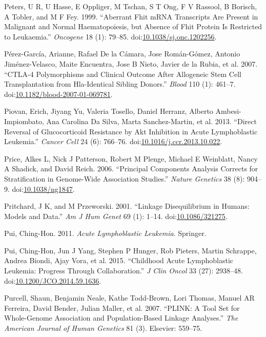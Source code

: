 \documentclass[]{DissertateOSU}
\begin{document}
\hypertarget{ref-peters_1999}{}
Peters, U R, U Hasse, E Oppliger, M Tschan, S T Ong, F V Rassool, B
Borisch, A Tobler, and M F Fey. 1999. ``Aberrant Fhit mRNA Transcripts
Are Present in Malignant and Normal Haematopoiesis, but Absence of Fhit
Protein Is Restricted to Leukaemia.'' \emph{Oncogene} 18 (1): 79--85.
doi:\href{https://doi.org/10.1038/sj.onc.1202256}{10.1038/sj.onc.1202256}.

\hypertarget{ref-perez_garcia_2007}{}
Pérez-García, Arianne, Rafael De la Cámara, Jose Román-Gómez, Antonio
Jiménez-Velasco, Maite Encuentra, Jose B Nieto, Javier de la Rubia, et
al. 2007. ``CTLA-4 Polymorphisms and Clinical Outcome After Allogeneic
Stem Cell Transplantation from Hla-Identical Sibling Donors.''
\emph{Blood} 110 (1): 461--7.
doi:\href{https://doi.org/10.1182/blood-2007-01-069781}{10.1182/blood-2007-01-069781}.

\hypertarget{ref-Piovan_2013}{}
Piovan, Erich, Jiyang Yu, Valeria Tosello, Daniel Herranz, Alberto
Ambesi-Impiombato, Ana Carolina Da Silva, Marta Sanchez-Martin, et al.
2013. ``Direct Reversal of Glucocorticoid Resistance by Akt Inhibition
in Acute Lymphoblastic Leukemia.'' \emph{Cancer Cell} 24 (6): 766--76.
doi:\href{https://doi.org/10.1016/j.ccr.2013.10.022}{10.1016/j.ccr.2013.10.022}.

\hypertarget{ref-Price_AL}{}
Price, Alkes L, Nick J Patterson, Robert M Plenge, Michael E Weinblatt,
Nancy A Shadick, and David Reich. 2006. ``Principal Components Analysis
Corrects for Stratification in Genome-Wide Association Studies.''
\emph{Nature Genetics} 38 (8): 904--9.
doi:\href{https://doi.org/10.1038/ng1847}{10.1038/ng1847}.

\hypertarget{ref-Pritchard_2001}{}
Pritchard, J K, and M Przeworski. 2001. ``Linkage Disequilibrium in
Humans: Models and Data.'' \emph{Am J Hum Genet} 69 (1): 1--14.
doi:\href{https://doi.org/10.1086/321275}{10.1086/321275}.

\hypertarget{ref-pui2011acute}{}
Pui, Ching-Hon. 2011. \emph{Acute Lymphoblastic Leukemia}. Springer.

\hypertarget{ref-pui_2015}{}
Pui, Ching-Hon, Jun J Yang, Stephen P Hunger, Rob Pieters, Martin
Schrappe, Andrea Biondi, Ajay Vora, et al. 2015. ``Childhood Acute
Lymphoblastic Leukemia: Progress Through Collaboration.'' \emph{J Clin
Oncol} 33 (27): 2938--48.
doi:\href{https://doi.org/10.1200/JCO.2014.59.1636}{10.1200/JCO.2014.59.1636}.

\hypertarget{ref-plink}{}
Purcell, Shaun, Benjamin Neale, Kathe Todd-Brown, Lori Thomas, Manuel AR
Ferreira, David Bender, Julian Maller, et al. 2007. ``PLINK: A Tool Set
for Whole-Genome Association and Population-Based Linkage Analyses.''
\emph{The American Journal of Human Genetics} 81 (3). Elsevier: 559--75.
\end{document}
